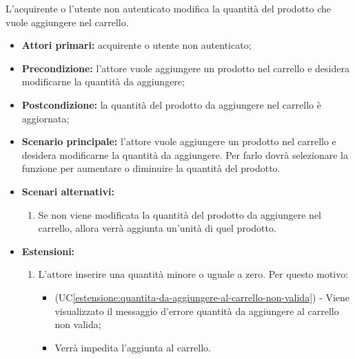 L'acquirente o l'utente non autenticato modifica la quantità del prodotto che vuole aggiungere nel carrello.
\begin{itemize}
	\item \textbf{Attori primari:} acquirente o utente non autenticato;
	\item \textbf{Precondizione:} l'attore vuole aggiungere un prodotto nel carrello e desidera modificarne la quantità da aggiungere;
	\item \textbf{Postcondizione:} la quantità del prodotto da aggiungere nel carrello è aggiornata;
	\item \textbf{Scenario principale:} l'attore vuole aggiungere un prodotto nel carrello e desidera modificarne la quantità da aggiungere. Per farlo dovrà selezionare la funzione per aumentare o diminuire la quantità del prodotto.
	\item \textbf{Scenari alternativi:}
	\begin{enumerate}[label=\lett]
        \item Se non viene modificata la quantità del prodotto da aggiungere nel carrello, allora verrà aggiunta un'unità di quel prodotto.
    \end{enumerate}
	\item \textbf{Estensioni:}
	\begin{enumerate}[label=\lett]
        \item L'attore inserire una quantità minore o uguale a zero. Per questo motivo:
        \begin{itemize}
            \item (UC\ref{estensione:quantita-da-aggiungere-al-carrello-non-valida}) - Viene visualizzato il messaggio d'errore quantità da aggiungere al carrello non valida;
            \item Verrà impedita l'aggiunta al carrello.
        \end{itemize}
	\end{enumerate}
\end{itemize}


